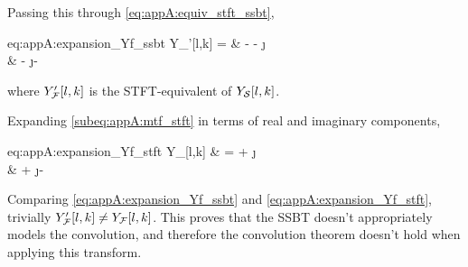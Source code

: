 Passing this through \cref{eq:appA:equiv_stft_ssbt},
\begin{equations}{eq:appA:expansion_Yf_ssbt}
    Y_{\F}'[l,k] =
        & - \xfr[l,k] \hfr[l,k] - \j \xfr[l,k] \hfr[l,k] \\
        & - \j \xfi[l,k] \hfr[l,k] - \xfi[l,k] \hfi[l,k]
\end{equations}
where $Y_{\F}'[l,k]$ is the STFT-equivalent of $Y_{\S}[l,k]$.

Expanding \cref{subeq:appA:mtf_stft} in terms of real and imaginary components,
\begin{equations}{eq:appA:expansion_Yf_stft}
    Y_{\F}[l,k] 
        & = \xfr[l,k] \hfr[l,k] + \j \xfr[l,k] \hfi[l,k] \\
        & + \j \xfi[l,k] \hfr[l,k] - \xfi[l,k] \hfi[l,k]
\end{equations}

Comparing \cref{eq:appA:expansion_Yf_ssbt} and \cref{eq:appA:expansion_Yf_stft}, trivially $Y_{\F}'[l,k] \neq Y_{\F}[l,k]$. This proves that the SSBT doesn't appropriately models the convolution, and therefore the convolution theorem doesn't hold when applying this transform.
